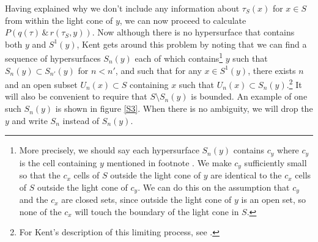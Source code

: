\documentclass[12pt]{report}
\begin{document}
Having explained why we don't include any information about $\tau_S(x)$ for $x\in S$ from within the light cone of $y$, we can now proceed to calculate  $P(q(\tau) \, \&\,  r(\tau_S,y))$. Now although there is no hypersurface that contains both $y$ and $S^1(y)$, Kent gets around this problem by noting that we can find a sequence of hypersurfaces $S_n(y)$ each  %
%
 of which contains\footnote{More precisely, we should say each hypersurface $S_n(y)$ contains $c_y$ where $c_y$ is the cell containing $y$ mentioned in footnote . We make $c_y$ sufficiently small so that the $c_x$ cells of $S$ outside the light cone of $y$ are identical to the $c_x$ cells of $S$ outside the light cone of $c_y$. We can do this on the assumption that $c_y$ and the $c_x$ are closed sets, since outside the light cone of $y$ is an open set, so none of the $c_x$ will touch the boundary of the light cone in $S$. } $y$ such that\label{siydef} $S_n(y)\subset S_{n'}(y)$ for $n<n'$, and such that for any $x\in S^1(y)$, there exists $n$ and an open subset $U_n(x)\subset S$ containing $x$ such that $U_n(x)\subset S_n(y)$.\footnote{For Kent's description of this limiting process, see \cite[2]{Kent2014}.} It will also be convenient to require that $S\setminus S_n(y)$ is bounded. An example of one such $S_n(y)$ is shown in figure \ref{S3}. When there is no ambiguity,  %
 we will drop the $y$ and write $S_n$ instead of $S_n(y)$. 
\end{document}
